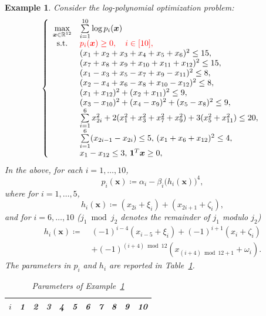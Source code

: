 \documentclass[pdflatex,sn-mathphys-num]{sn-jnl}%
\newcommand{\rd}[1]{{\color{red}#1}}
\newcommand{\vect}[1]{\boldsymbol{#1}}
\newcommand{\st}{\mathrm{s.t.}}
\newcommand{\ddd}{,\ldots,}
\theoremstyle{thmstyleone}%
\theoremstyle{thmstyletwo}%
\newtheorem{example}{Example}%
\theoremstyle{thmstylethree}%
\begin{document}
\begin{example} \label{ex:dim12}
	Consider the log-polynomial optimization problem:
	\begin{equation*}
		\left\{\begin{array}{cl}
			\max\limits_{\vect{x} \in \mathbb{R}^{12}} & \sum\limits_{i=1}^{10} \log p_i(\vect{x}) \\
			\st & \rd{p_i(\vect{x})\geq 0,\quad i\in[10],}\\
			& (x_1 + x_2 + x_3 + x_4 + x_5 + x_6)^2 \leq 15,\\
			& (x_7 + x_8 + x_9 + x_{10} + x_{11} + x_{12})^2 \leq 15,\\
			& (x_1 - x_3 + x_5 - x_7 + x_9 - x_{11})^2 \leq 8, \\
			& (x_2 - x_4 + x_6 - x_8 + x_{10} - x_{12})^2 \leq 8, \\
			& (x_1 + x_{12})^2 + (x_2 + x_{11})^2 \leq 9,\\
			& (x_3 - x_{10})^2 + (x_4 - x_9)^2 + (x_5-x_8)^2 \leq 9, \\
			& \sum\limits_{i=1}^6 x_{2i}^2  + 2(x_1^2 + x_3^2 + x_7^2 + x_9^2) + 3(x_5^2 + x_{11}^2) \leq 20,\\
			& \sum\limits_{i=1}^6 (x_{2i-1} - x_{2i}) \leq 5, \, (x_1 + x_6 + x_{12})^2 \leq 4, \\
			& x_1 - x_{12} \leq 3, \, \mathbf{1}^T \vect{x} \geq 0,
		\end{array}\right.
	\end{equation*}
	In the above, for each $i = 1\ddd 10$,
	\begin{equation*}
		p_i(\vect{x}) \coloneqq \alpha_i - \beta_i \big(h_i(\vect{x})\big)^4,
	\end{equation*}
	where for $i=1,\ldots, 5$,
	\[
	h_i(\vect{x}) \coloneqq (x_{2i}+\xi_i) + (x_{2i+1}+\zeta_i),
	\]
	and for $i=6,\ldots, 10$ ($j_1\bmod j_2$ denotes the remainder of $j_1$ modulo $j_2$)
	\[ \begin{array}{ll}
		h_i(\vect{x}) \coloneqq \;& (-1)^{i-4}(x_{i-5}+\xi_i) 
		+ (-1)^{i+1} (x_i +\zeta_i) \\
		& + (-1)^{(i+4) \bmod 12} (x_{(i+4) \bmod 12 + 1} + \omega_i).
	\end{array}
	\]
	The parameters in $p_i$ and $h_i$ are reported in
	Table~\ref{tab:dim12}.
	\begin{table}[htb]
		\centering
		\caption{Parameters of Example~\ref{ex:dim12}}
		\label{tab:dim12}
		\begin{tabular}{|c|c|c|c|c|c|c|c|c|c|c|}
			\hline
			$i$ & 1 & 2 & 3 & 4 & 5 & 6 & 7 & 8 & 9 & 10 \\ \hline

\end{tabular}
\end{table}
\end{example}
\end{document}
